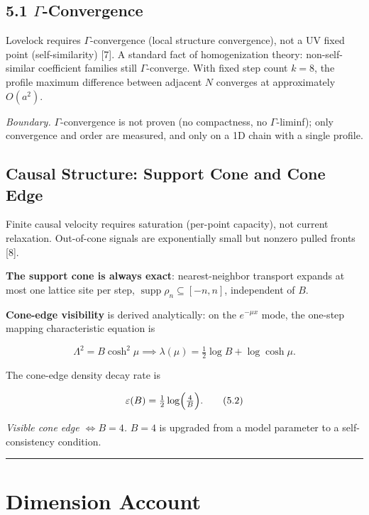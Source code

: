 \documentclass[
  11pt,
]{article}
\begin{document}
\subsection{\texorpdfstring{5.1
\(\Gamma\)-Convergence}{5.1 \textbackslash Gamma-Convergence}}\label{gamma-convergence}

Lovelock requires \(\Gamma\)-convergence (local structure convergence),
not a UV fixed point (self-similarity) {[}7{]}. A standard fact of
homogenization theory: non-self-similar coefficient families still
\(\Gamma\)-converge. With fixed step count \(k=8\), the profile maximum
difference between adjacent \(N\) converges at approximately \(O(a^2)\).

\emph{Boundary.} \(\Gamma\)-convergence is not proven (no compactness,
no \(\Gamma\)-liminf); only convergence and order are measured, and only
on a 1D chain with a single profile.

\subsection{Causal Structure: Support Cone and Cone
Edge}\label{causal-structure-support-cone-and-cone-edge}

Finite causal velocity requires saturation (per-point capacity), not
current relaxation. Out-of-cone signals are exponentially small but
nonzero pulled fronts {[}8{]}.

\textbf{The support cone is always exact}: nearest-neighbor transport
expands at most one lattice site per step,
\(\operatorname{supp}\rho_n\subseteq[-n,n]\), independent of \(B\).

\textbf{Cone-edge visibility} is derived analytically: on the
\(e^{-\mu x}\) mode, the one-step mapping characteristic equation is

\[
\Lambda^2=B\cosh^2\mu \implies \lambda(\mu)=\tfrac12\log B+\log\cosh\mu.
\tag{5.1}
\]

The cone-edge density decay rate is

\[
\varepsilon(B)=\tfrac12\log\Bigl(\tfrac4B\Bigr).
\tag{5.2}
\]

\emph{Visible cone edge \(\iff B=4\).} \(B=4\) is upgraded from a model
parameter to a self-consistency condition.

\begin{center}\rule{0.5\linewidth}{0.5pt}\end{center}

\section{Dimension Account}\label{dimension-account}
\end{document}
